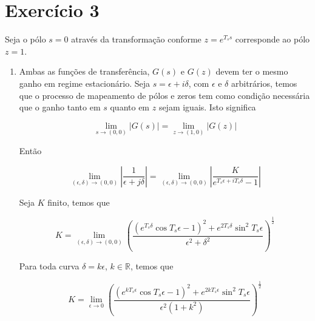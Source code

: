     \section*{Exercício 3}
    
    Seja o pólo $s=0$ através da transformação conforme $z = e^{T_s s}$ corresponde ao pólo $z = 1$.
    
        \begin{enumerate}
        
        \item %
        \label{item:ex3a}
        
        Ambas as funções de transferência, $G(s)$ e $G(z)$ devem ter o mesmo ganho em regime estacionário. Seja $s = \epsilon + i \delta$, com $\epsilon$ e $\delta$ arbitrários, temos que o processo de mapeamento de pólos e zeros tem como condição necessária que o ganho tanto em $s$ quanto em $z$ sejam iguais. Isto significa 
        
            \begin{equation}
                 \lim\limits_{s \rightarrow (0, 0)} \left \lvert G(s) \right \rvert = \lim\limits_{z \rightarrow (1, 0)} \left \lvert G(z) \right \rvert
            \label{eq:limitcond}
            \end{equation}
        
        Então 
        
            \begin{equation}
                \lim\limits_{(\epsilon, \delta) \rightarrow (0, 0)} \left \lvert \frac{1}{\epsilon + j \delta} \right \rvert = \lim\limits_{(\epsilon, \delta) \rightarrow (0, 0)} \left \lvert \frac{K}{e^{T_s \epsilon + i T_s \delta} - 1} \right \rvert
            \end{equation}
        
        Seja $K$ finito, temos que 
        
            \begin{equation*}
                K = \lim\limits_{(\epsilon, \delta) \rightarrow (0, 0)} \left( \frac{(e^{T_s \delta} \cos{T_s \epsilon}  - 1)^2 + e^{2 T_s \delta} \sin^2 T_s \epsilon}{\epsilon^2 + \delta^2} \right)^{\frac{1}{2}}
            \end{equation*}
        
        Para toda curva $\delta = k \epsilon$, $k \in \mathbb{R}$, temos que 
        
            \begin{equation*}
                K = \lim\limits_{\epsilon \rightarrow 0} \left( \frac{(e^{k T_s \epsilon} \cos{T_s \epsilon}  - 1)^2 + e^{2 k T_s \epsilon} \sin^2 T_s \epsilon}{\epsilon^2(1 + k^2)} \right)^{\frac{1}{2}}
            \end{equation*}
        

\end{enumerate}
